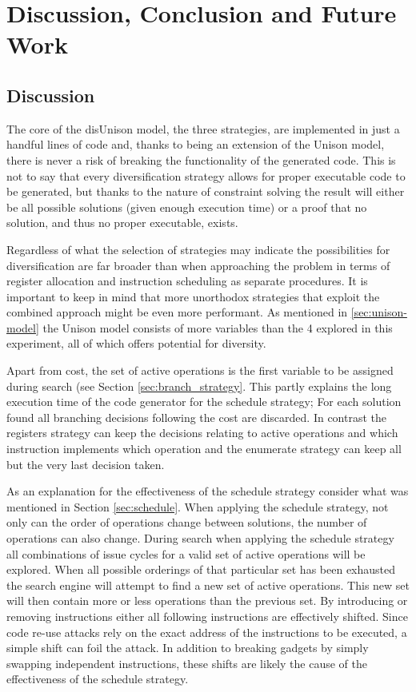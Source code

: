 \chapter{Discussion, Conclusion and Future Work}
\label{chapter:discussion}

\section{Discussion}
\label{sec:discussion}

The core of the disUnison model, the three strategies, are implemented in just a handful
lines of code and, thanks to being an extension of the Unison model, there is never a risk
of breaking the functionality of the generated code. This is not to say that every
diversification strategy allows for proper executable code to be generated, but thanks to
the nature of constraint solving the result will either be all possible solutions
(given enough execution time) or a proof that no solution, and thus no proper executable,
exists.

Regardless of what the selection of strategies may indicate the possibilities for
diversification are far broader than when approaching the problem in terms of register
allocation and instruction scheduling as separate procedures. It is important to keep in
mind that more unorthodox strategies that exploit the combined approach might be even
more performant. As mentioned in \ref{sec:unison-model} the Unison model consists of more
variables than the 4 explored in this experiment, all of which offers potential for
diversity.

Apart from cost, the set of active operations is the first variable to be assigned during
search (see Section \ref{sec:branch_strategy}. This partly explains the long execution
time of the code generator for the schedule strategy; For each solution found all branching
decisions following the cost are discarded. In contrast the registers strategy can keep
the decisions relating to active operations and which instruction implements which
operation and the enumerate strategy can keep all but the very last decision taken.

As an explanation for the effectiveness of the schedule strategy consider what was
mentioned in Section \ref{sec:schedule}. When applying the schedule strategy, not only can
the order of operations change between solutions, the number of operations can also change.
During search when applying the schedule strategy all combinations of issue cycles for a
valid set of active operations will be explored. When all possible orderings of that
particular set has been exhausted the search engine will attempt to find a new set of
active operations. This new set will then contain more or less operations than
the previous set. By introducing or removing instructions either all following instructions
are effectively shifted. Since code re-use attacks rely on the exact address of the
instructions to be executed, a simple shift can foil the attack. In addition to breaking
gadgets by simply swapping independent instructions, these shifts are likely the cause of
the effectiveness of the schedule strategy.


